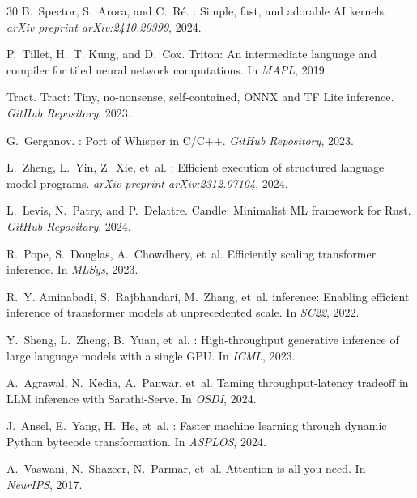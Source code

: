 \begin{thebibliography}{30}
B.~Spector, S.~Arora, and C.~R\'e.
: Simple, fast, and adorable {AI} kernels.
\newblock \emph{arXiv preprint arXiv:2410.20399}, 2024.

P.~Tillet, H.~T. Kung, and D.~Cox.
\newblock Triton: An intermediate language and compiler for tiled neural network computations.
\newblock In \emph{MAPL}, 2019.

Tract.
\newblock Tract: Tiny, no-nonsense, self-contained, {ONNX} and {TF Lite} inference.
\newblock \emph{GitHub Repository}, 2023.

G.~Gerganov.
: Port of {Whisper} in {C/C++}.
\newblock \emph{GitHub Repository}, 2023.

L.~Zheng, L.~Yin, Z.~Xie, et~al.
: Efficient execution of structured language model programs.
\newblock \emph{arXiv preprint arXiv:2312.07104}, 2024.

L.~Levis, N.~Patry, and P.~Delattre.
\newblock Candle: Minimalist {ML} framework for {Rust}.
\newblock \emph{GitHub Repository}, 2024.

R.~Pope, S.~Douglas, A.~Chowdhery, et~al.
\newblock Efficiently scaling transformer inference.
\newblock In \emph{MLSys}, 2023.

R.~Y. Aminabadi, S.~Rajbhandari, M.~Zhang, et~al.
 inference: Enabling efficient inference of transformer models at unprecedented scale.
\newblock In \emph{SC22}, 2022.

Y.~Sheng, L.~Zheng, B.~Yuan, et~al.
: High-throughput generative inference of large language models with a single {GPU}.
\newblock In \emph{ICML}, 2023.

A.~Agrawal, N.~Kedia, A.~Panwar, et~al.
\newblock Taming throughput-latency tradeoff in {LLM} inference with {Sarathi-Serve}.
\newblock In \emph{OSDI}, 2024.

J.~Ansel, E.~Yang, H.~He, et~al.
: Faster machine learning through dynamic {Python} bytecode transformation.
\newblock In \emph{ASPLOS}, 2024.

A.~Vaswani, N.~Shazeer, N.~Parmar, et~al.
\newblock Attention is all you need.
\newblock In \emph{NeurIPS}, 2017.

\end{thebibliography}

